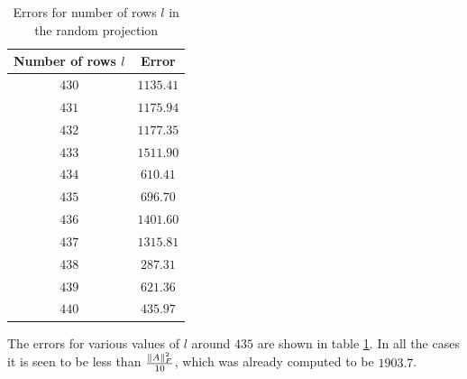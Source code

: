\documentclass[11pt]{article}
\begin{document}
\begin{table}[!h] 
    \centering
    \caption{Errors for number of rows $l$ in the random projection}
    \label{ErrRandProj}
    \begin{tabular}{|c|c|}
      \hline
   Number of rows $l$  & Error  \\
      \hline      
      $430$ &      $1135.41$  \\
      \hline
      $431$ &      $1175.94$  \\
      \hline
      $432$ &      $1177.35$  \\
      \hline
      $433$ &      $1511.90$  \\
      \hline
      $434$ &      $610.41$  \\
      \hline
      $435$ &      $696.70$  \\
      \hline
      $436$ &      $1401.60$  \\
      \hline
      $437$ &      $1315.81$  \\
      \hline
      $438$ &      $287.31$  \\
      \hline
      $439$ &      $621.36$  \\
      \hline
      $440$ &      $435.97$  \\
      \hline
    \end{tabular}
\end{table}

The errors for various values of $l$ around $435$ are shown in table \ref{ErrRandProj}. In all the cases it is seen to be less than $\frac{\lVert A\rVert_F^2}{10}$, which was already computed to be $1903.7$.
\end{document}
